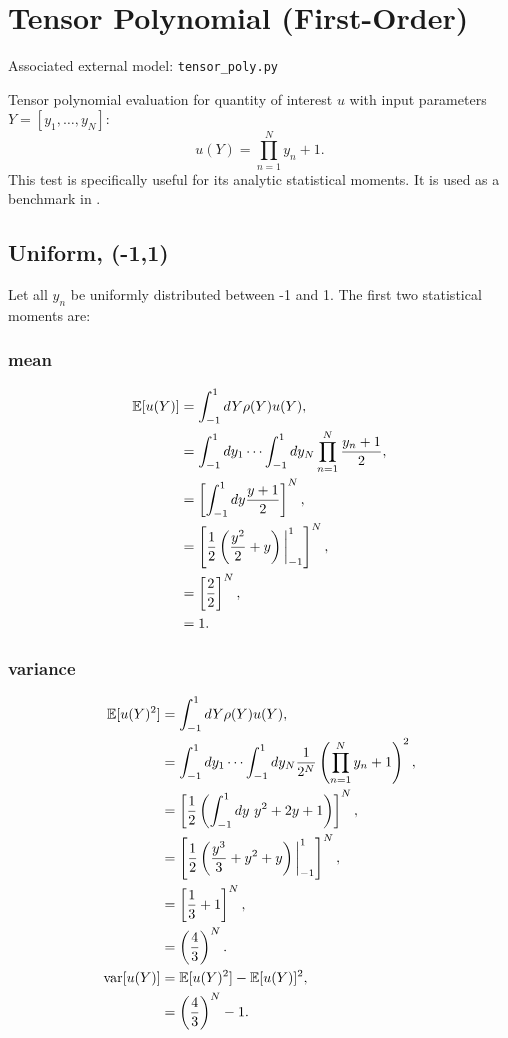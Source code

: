\section{Tensor Polynomial (First-Order)}
Associated external model: \texttt{tensor\_poly.py}

Tensor polynomial evaluation for quantity of interest $u$ with input parameters $Y=[y_1,\ldots,y_N]$:
\begin{equation}
u(Y) = \prod_{n=1}^N y_n+1.
\end{equation}
This test is specifically useful for its analytic statistical moments.  It is used as a benchmark in
\cite{ayreseaton2015}.

\subsection{Uniform, (-1,1)}
Let all $y_n$ be uniformly distributed between -1 and 1.  The first two statistical moments are:

\subsubsection{mean}
\begin{align}
\mathbb{E}[ u(Y)] &=\int_{-1}^1 dY \rho(Y)u(Y),\\
  &=\int_{-1}^1 dy_1\cdots\int_{-1}^1 dy_N \prod_{n=1}^N \frac{y_n+1}{2},\\
  &=\left[ \int_{-1}^1 dy \frac{y+1}{2}\right]^N,\\
  &=\left[\frac{1}{2}\left(\frac{y^2}{2}+y\right)\bigg|_{-1}^1\right]^N,\\
  &=\left[\frac{2}{2}\right]^N,\\
  &=1.
\end{align}

\subsubsection{variance}
\begin{align}
\mathbb{E}[ u(Y)^2] &= \int_{-1}^1 dY \rho(Y)u(Y),\\
  &=\int_{-1}^1 dy_1\cdots\int_{-1}^1 dy_N \frac{1}{2^N} \left(\prod_{n=1}^N y_n+1\right)^2,\\
  &=\left[\frac{1}{2}\left(\int_{-1}^1 dy\ y^2+2y+1 \right)\right]^N,\\
  &=\left[\frac{1}{2}\left(\frac{y^3}{3}+y^2+y \right)\bigg|_{-1}^1 \right]^N,\\
  &=\left[\frac{1}{3}+1\right]^N, \\
  &=\left(\frac{4}{3}\right)^N.\\
\text{var}[u(Y)] &= \mathbb{E}[ u(Y)^2]-\mathbb{E}[ u(Y)]^2,\\
  &= \left(\frac{4}{3}\right)^N-1.
\end{align}

